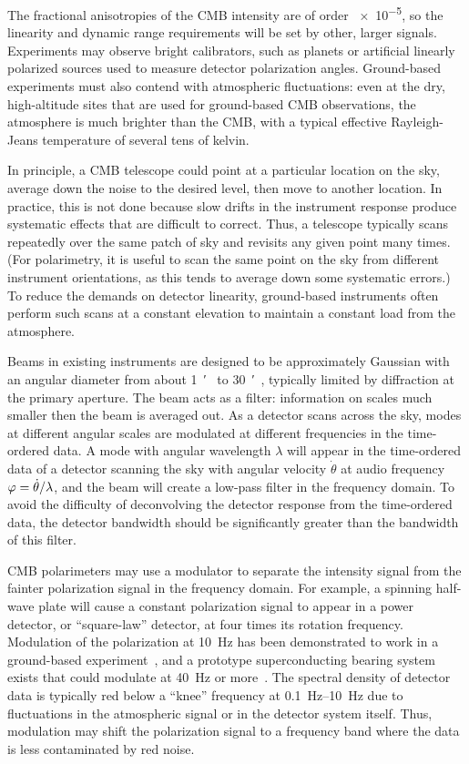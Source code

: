 The fractional anisotropies of the CMB intensity are of order \num{e-5}, so the linearity and dynamic range requirements will be set by other, larger signals.
Experiments may observe bright calibrators, such as planets or artificial linearly polarized sources used to measure detector polarization angles.
Ground-based experiments must also contend with atmospheric fluctuations: even at the dry, high-altitude sites that are used for ground-based CMB observations, the atmosphere is much brighter than the CMB, with a typical effective Rayleigh-Jeans temperature of several tens of kelvin.

In principle, a CMB telescope could point at a particular location on the sky, average down the noise to the desired level, then move to another location.
In practice, this is not done because slow drifts in the instrument response produce systematic effects that are difficult to correct. 
Thus, a telescope typically scans repeatedly over the same 
patch of sky and revisits any given point many times.
(For polarimetry, it is useful to scan the same point on the sky from different instrument orientations, as this tends to average down some systematic errors.)
To reduce the demands on detector linearity, ground-based instruments often perform such scans at a constant elevation to maintain a constant load from the atmosphere.

Beams in existing instruments are designed to be approximately Gaussian with an angular diameter from about \SI{1}{\arcminute}~\autocite{ACT2011ApJS} to \SI{30}{\arcminute}~\autocite{BICEP2II2014ApJ},
typically limited by diffraction at the primary aperture.
The beam acts as a filter: information on scales much smaller then the beam is averaged out.
As a detector scans across the sky, modes at different angular scales are modulated at different frequencies in the time-ordered data.
A mode with angular wavelength $\lambda$ will appear in the time-ordered data of a detector scanning the sky with angular velocity $\dot{\theta}$ at audio frequency
$\varphi = \dot{\theta} / \lambda$, and the beam will create a low-pass filter in the frequency domain.
To avoid the difficulty of deconvolving the detector response from the time-ordered data, the detector bandwidth should be significantly greater than the bandwidth of this filter.

CMB polarimeters may use a modulator to separate the intensity signal from the fainter polarization signal in the frequency domain.
For example, a spinning half-wave plate will cause a constant polarization signal to appear in a power detector, or ``square-law'' detector, at four times its rotation frequency.
Modulation of the polarization at \SI{10}{Hz} has been demonstrated to work in a ground-based experiment~\autocite{Kusaka2014RSI},
and a prototype superconducting bearing system exists that could modulate at \SI{40}{Hz} or more~\autocite{Johnson2017RSI}.
The spectral density of detector data is typically red below a ``knee'' frequency at \SIrange{0.1}{10}{Hz} due to fluctuations in the atmospheric signal or in the detector system itself.
Thus, modulation may shift the polarization signal to a frequency band where the data is less contaminated by red noise.

